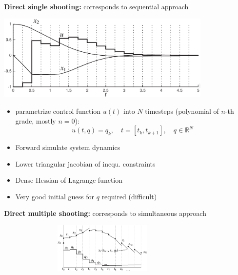 \begin{tcolorbox}[colback=violet!5!white,colframe=violet!75!black,title=\textbf{Direct
    Approach}]
\textbf{Direct single shooting:} corresponds to sequential approach\\
\begin{center}
  \includegraphics[width=0.8\textwidth]{direct_single_shooting}
\end{center}

  \begin{itemize}
  \item parametrize control function $u(t)$ into $N$ timesteps (polynomial of
    $n$-th grade, mostly $n=0$):
    \[u(t,q)=q_k,\quad t=[t_k,t_{k+1}],\quad q\in \mathbb{R}^N\]
  \item Forward simulate system dynamics
  \item Lower triangular jacobian of inequ. constraints
  \item Dense Hessian of Lagrange function
  \item Very good initial guess for $q$ required (difficult)\\
  \end{itemize}
  
\textbf{Direct multiple shooting:} corresponds to simultaneous approach\\
\begin{center}
  \includegraphics[width=0.8\textwidth,height=25mm]{direct_multiple_shooting}
\end{center}


\end{tcolorbox}
